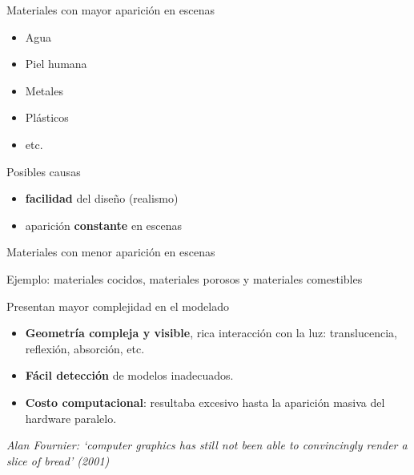 \documentclass[spanish,unknownkeysallowed]{beamer}
\begin{document}
\begin{frame}{Materiales con mayor aparición en escenas}

\begin{itemize}
\item Agua
\item Piel humana
\item Metales
\item Plásticos
\item etc. 
\end{itemize}

Posibles causas
\begin{itemize}
\item \textbf{facilidad} del diseño (realismo)
\item aparición \textbf{constante} en escenas
\end{itemize}

\end{frame}

\begin{frame}{Materiales con menor aparición en escenas}

Ejemplo: materiales cocidos, materiales porosos y materiales comestibles

Presentan mayor complejidad en el modelado

\begin{itemize}
\item \textbf{Geometría compleja y visible}, rica interacción con la luz: translucencia, reflexión, absorción, etc.
\item \textbf{Fácil detección} de modelos inadecuados.
\item \textbf{Costo computacional}: resultaba excesivo hasta la aparición masiva del hardware paralelo.
\end{itemize}

{\it Alan Fournier: `computer graphics has still not been
able to convincingly render a slice of bread' (2001)}


\end{frame}
\end{document}
